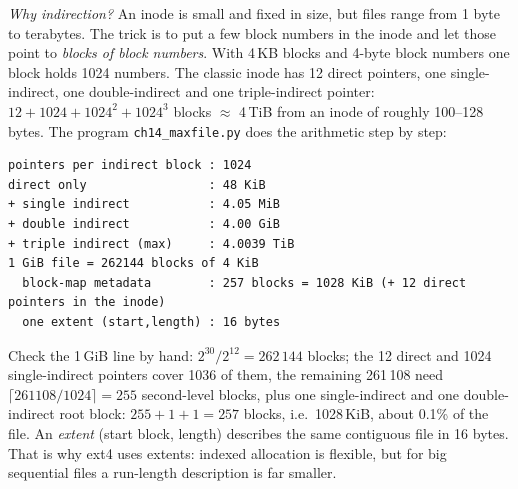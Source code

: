 \begin{example}
\emph{Why indirection?} An inode is small and fixed in size, but
files range from 1 byte to terabytes. The trick is to put a few block
numbers in the inode and let those point to \emph{blocks of block
numbers}. With 4\,KB blocks and 4-byte block numbers one block holds
1024 numbers. The classic inode has 12 direct pointers, one
single-indirect, one double-indirect and one triple-indirect pointer:
$12+1024+1024^2+1024^3$ blocks $\approx$ 4\,TiB from an inode of
roughly 100--128 bytes. The program \texttt{ch14\_maxfile.py} does the
arithmetic step by step:

\begin{lstlisting}[basicstyle=\ttfamily\scriptsize,caption={Real output of
\texttt{python3 ch14\_maxfile.py}.}]
pointers per indirect block : 1024
direct only                 : 48 KiB
+ single indirect           : 4.05 MiB
+ double indirect           : 4.00 GiB
+ triple indirect (max)     : 4.0039 TiB
1 GiB file = 262144 blocks of 4 KiB
  block-map metadata        : 257 blocks = 1028 KiB (+ 12 direct pointers in the inode)
  one extent (start,length) : 16 bytes
\end{lstlisting}
Check the 1\,GiB line by hand: $2^{30}/2^{12}=262\,144$ blocks; the
12 direct and 1024 single-indirect pointers cover 1036 of them, the
remaining 261\,108 need $\lceil261108/1024\rceil=255$ second-level
blocks, plus one single-indirect and one double-indirect root block:
$255+1+1=257$ blocks, i.e.\ 1028\,KiB, about 0.1\% of the file. An
\emph{extent} (start block, length) describes the same contiguous
file in 16 bytes. That is why ext4 uses extents: indexed allocation
is flexible, but for big sequential files a run-length description is
far smaller.
\end{example}

